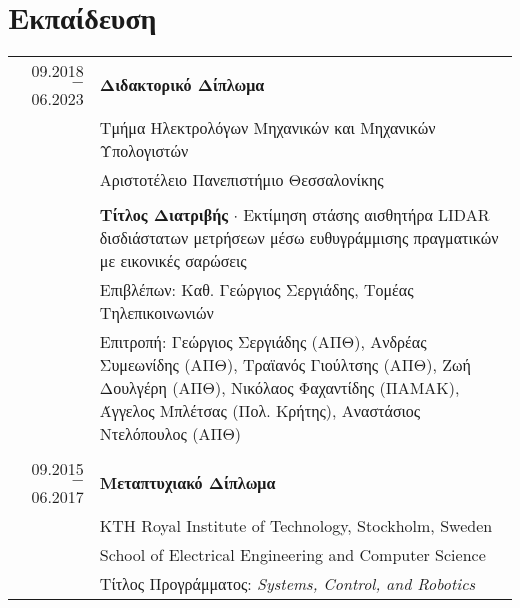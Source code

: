 \documentclass[a4paper,10pt,twoside]{article}
\begin{document}

\section{Εκπαίδευση}

\begin{tabular}{rp{11cm}}
09.2018 $-$ 06.2023 & \textbf{Διδακτορικό Δίπλωμα} \\
                    & Τμήμα Ηλεκτρολόγων Μηχανικών και Μηχανικών Υπολογιστών \\
                    & Αριστοτέλειο Πανεπιστήμιο Θεσσαλονίκης \\

&\\                 & \textbf{Τίτλος Διατριβής} $\cdot$ Εκτίμηση στάσης αισθητήρα LIDAR δισδιάστατων μετρήσεων μέσω ευθυγράμμισης πραγματικών με εικονικές σαρώσεις\\
                    & Επιβλέπων: Καθ. Γεώργιος Σεργιάδης, Τομέας Τηλεπικοινωνιών\\
                    & Επιτροπή: Γεώργιος Σεργιάδης (ΑΠΘ), Ανδρέας Συμεωνίδης (ΑΠΘ), Τραϊανός Γιούλτσης (ΑΠΘ), Ζωή Δουλγέρη (ΑΠΘ), Νικόλαος Φαχαντίδης (ΠΑΜΑΚ), Άγγελος Μπλέτσας (Πολ. Κρήτης), Αναστάσιος Ντελόπουλος (ΑΠΘ) \\

&\\
09.2015 $-$ 06.2017 & \textbf{Μεταπτυχιακό Δίπλωμα} \\
                    & KTH Royal Institute of Technology, Stockholm, Sweden\\
                    & School of Electrical Engineering and Computer Science\\
                    & Τίτλος Προγράμματος: \textit{Systems, Control, and Robotics}\\


\end{tabular}
\end{document}
